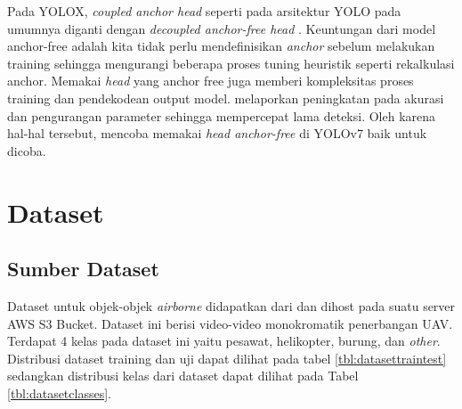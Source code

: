    Pada YOLOX, \emph{coupled anchor head} seperti pada arsitektur YOLO pada umumnya diganti dengan \emph{decoupled anchor-free head} \parencite{yolox}.
    Keuntungan dari model anchor-free adalah kita tidak perlu mendefinisikan \emph{anchor} sebelum melakukan training sehingga mengurangi beberapa proses
    tuning heuristik seperti rekalkulasi anchor. Memakai \emph{head} yang anchor free juga memberi kompleksitas proses training dan pendekodean output model.
    \cite{yolox} melaporkan peningkatan pada akurasi dan pengurangan parameter sehingga mempercepat lama deteksi.
    Oleh karena hal-hal tersebut, mencoba memakai \emph{head anchor-free} di YOLOv7 baik untuk dicoba.
    
    
\section{Dataset}
\label{section:dataset}

  \subsection{Sumber Dataset}
    Dataset untuk objek-objek \emph{airborne} didapatkan dari \textcite{aot_dataset} dan dihost pada suatu server AWS S3 Bucket.
    Dataset ini berisi video-video monokromatik penerbangan UAV.
    Terdapat 4 kelas pada dataset ini yaitu pesawat, helikopter, burung, dan \emph{other}.
    Distribusi dataset training dan uji dapat dilihat pada tabel \ref{tbl:datasettraintest} sedangkan distribusi kelas dari dataset dapat dilihat pada Tabel \ref{tbl:datasetclasses}.
    
    
  
